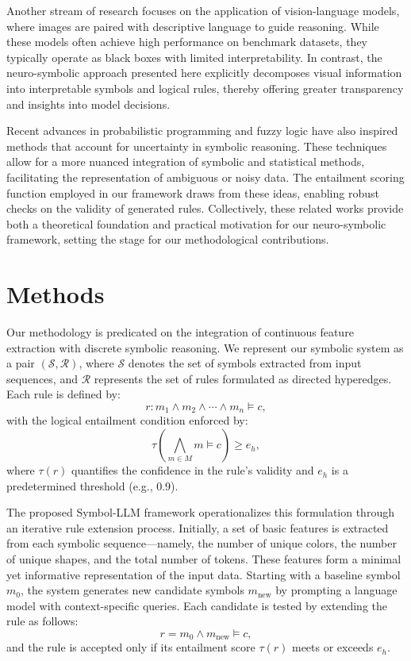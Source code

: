 \documentclass[11pt]{article}
\begin{document}
Another stream of research focuses on the application of vision-language models, where images are paired with descriptive language to guide reasoning. While these models often achieve high performance on benchmark datasets, they typically operate as black boxes with limited interpretability. In contrast, the neuro-symbolic approach presented here explicitly decomposes visual information into interpretable symbols and logical rules, thereby offering greater transparency and insights into model decisions.

Recent advances in probabilistic programming and fuzzy logic have also inspired methods that account for uncertainty in symbolic reasoning. These techniques allow for a more nuanced integration of symbolic and statistical methods, facilitating the representation of ambiguous or noisy data. The entailment scoring function employed in our framework draws from these ideas, enabling robust checks on the validity of generated rules. Collectively, these related works provide both a theoretical foundation and practical motivation for our neuro-symbolic framework, setting the stage for our methodological contributions.

\section{Methods}
Our methodology is predicated on the integration of continuous feature extraction with discrete symbolic reasoning. We represent our symbolic system as a pair \((\mathcal{S}, \mathcal{R})\), where \(\mathcal{S}\) denotes the set of symbols extracted from input sequences, and \(\mathcal{R}\) represents the set of rules formulated as directed hyperedges. Each rule is defined by:
\[
r: m_1 \wedge m_2 \wedge \cdots \wedge m_n \models c,
\]
with the logical entailment condition enforced by:
\[
\tau\left(\bigwedge_{m \in M} m \models c\right) \geq e_h,
\]
where \(\tau(r)\) quantifies the confidence in the rule's validity and \(e_h\) is a predetermined threshold (e.g., 0.9).

The proposed Symbol-LLM framework operationalizes this formulation through an iterative rule extension process. Initially, a set of basic features is extracted from each symbolic sequence—namely, the number of unique colors, the number of unique shapes, and the total number of tokens. These features form a minimal yet informative representation of the input data. Starting with a baseline symbol \(m_0\), the system generates new candidate symbols \(m_{\text{new}}\) by prompting a language model with context-specific queries. Each candidate is tested by extending the rule as follows:
\[
r = m_0 \wedge m_{\text{new}} \models c,
\]
and the rule is accepted only if its entailment score \(\tau(r)\) meets or exceeds \(e_h\).
\end{document}
